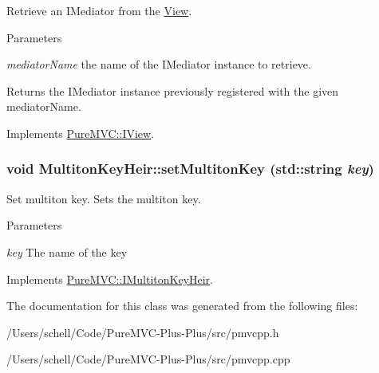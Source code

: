 Retrieve an {\ttfamily IMediator} from the {\ttfamily \hyperlink{class_pure_m_v_c_1_1_view}{View}}. 
\begin{DoxyParams}{Parameters}
\item[{\em mediatorName}]the name of the {\ttfamily IMediator} instance to retrieve. \end{DoxyParams}
\begin{DoxyReturn}{Returns}
the {\ttfamily IMediator} instance previously registered with the given {\ttfamily mediatorName}. 
\end{DoxyReturn}


Implements \hyperlink{class_pure_m_v_c_1_1_i_view_abf6f388473042970e62d52705b1448dc}{PureMVC::IView}.\hypertarget{class_pure_m_v_c_1_1_multiton_key_heir_abc70ef7c066bc8d7bf0196ec727599bb}{
\subsubsection[{setMultitonKey}]{\setlength{\rightskip}{0pt plus 5cm}void MultitonKeyHeir::setMultitonKey (std::string {\em key})}}
\label{class_pure_m_v_c_1_1_multiton_key_heir_abc70ef7c066bc8d7bf0196ec727599bb}


Set multiton key. Sets the multiton key. 
\begin{DoxyParams}{Parameters}
\item[{\em key}]The name of the key \end{DoxyParams}


Implements \hyperlink{class_pure_m_v_c_1_1_i_multiton_key_heir_a03acb75ab79defba2c28b8de1bbe1ca6}{PureMVC::IMultitonKeyHeir}.

The documentation for this class was generated from the following files:\begin{DoxyCompactItemize}
\item 
/Users/schell/Code/PureMVC-\/Plus-\/Plus/src/pmvcpp.h\item 
/Users/schell/Code/PureMVC-\/Plus-\/Plus/src/pmvcpp.cpp\end{DoxyCompactItemize}
